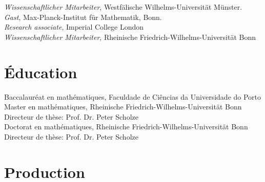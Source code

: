 \documentclass[12pt]{article} %
\begin{document}
 \emph{Wissenschaftlicher Mitarbeiter}, Westfälische Wilhelms-Universität Münster. \\

 \emph{Gast}, Max-Planck-Institut für Mathematik, Bonn. \\

\emph{Research associate}, Imperial College London \\

\emph{Wissenschaftlicher Mitarbeiter}, Rheinische Friedrich-Wilhelms-Universität Bonn


\section*{Éducation}
Baccalauréat en mathématiques, Faculdade de Ciências da Universidade do Porto\\

Master en mathématiques, Rheinische Friedrich-Wilhelms-Universität Bonn \\Directeur de thèse: Prof. Dr. Peter Scholze \\

Doctorat en mathématiques, Rheinische Friedrich-Wilhelms-Universität Bonn \\ Directeur de thèse: Prof. Dr. Peter Scholze




\section*{Production}
\end{document}
